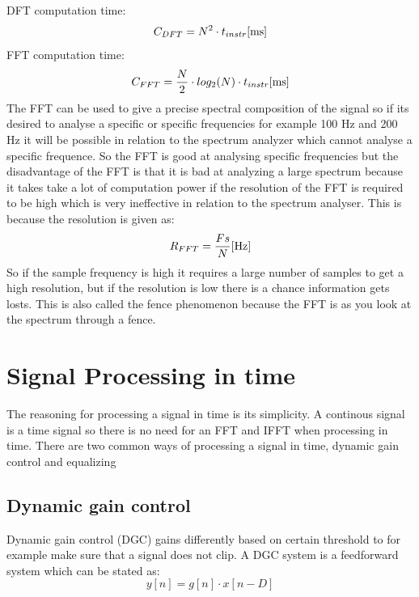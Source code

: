 
DFT computation time:
\begin{equation}
C_{DFT} = N^{2}\cdot t_{instr} \enhed{ms}
\end{equation}
FFT computation time:
\begin{equation}
C_{FFT} = \frac{N}{2}\cdot log_{2}(N)\cdot t_{instr} \enhed{ms}
\end{equation}
The FFT can be used to give a precise spectral composition of the signal so if its desired to analyse a specific or specific frequencies for example 100 Hz and 200 Hz it will be possible in relation to the spectrum analyzer which cannot analyse a specific frequence. So the FFT is good at analysing specific frequencies but the disadvantage of the FFT is that it is bad at analyzing a large spectrum because it takes take a lot of computation power if the resolution of the FFT is required to be high which is very ineffective in relation to the spectrum analyser. This is because the resolution is given as:
\begin{equation}
R_{FFT} = \frac{Fs}{N} \enhed{Hz}
\end{equation} 
So if the sample frequency is high it requires a large number of samples to get a high resolution, but if the resolution is low there is a chance information gets losts. This is also called the fence phenomenon because the FFT is as you look at the spectrum through a fence. 









\section{Signal Processing in time}
The reasoning for processing a signal in time is its simplicity. A continous signal is a time signal so there is no need for an FFT and IFFT when processing in time. There are two common ways of processing a signal in time, dynamic gain control and equalizing  


\subsection*{Dynamic gain control}
Dynamic gain control (DGC) gains differently based on certain threshold to for example make sure that a signal does not clip. A DGC system is a feedforward system which can be stated as:
\begin{equation}
y[n] = g[n]\cdot x[n-D]
\end{equation}

